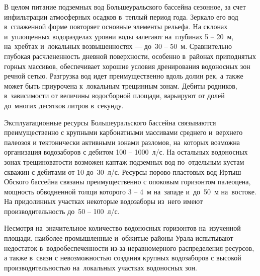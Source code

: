 В целом питание подземных вод Большеуральского бассейна сезонное, за счет инфильтрации атмосферных осадков в~теплый период года. Зеркало его вод в~сглаженной форме повторяет основные элементы рельефа. На склонах и~уплощенных водоразделах уровни воды залегают на~глубинах 5  --  20~м, на~хребтах и~локальных возвышенностях  ---  до~30  --  50~м. Сравнительно глубокая расчлененность дневной поверхности, особенно в~районах приподнятых горных массивов, обеспечивает хорошие условия дренирования водоносных зон речной сетью. Разгрузка вод идет преимущественно вдоль долин рек, а также может быть приурочена к~локальным трещинным зонам. Дебиты родников, в~зависимости от величины водосборной площади, варьируют от долей до~многих десятков литров в~секунду.

Эксплуатационные ресурсы Большеуральского бассейна связываются преимущественно с крупными карбонатными массивами среднего и~верхнего палеозоя и тектонически активными зонами разломов, на~которых возможна организация водозаборов с дебитом 100  --  1000~л/с. На остальных водоносных зонах трещиноватости возможен каптаж подземных вод по~отдельным кустам скважин с дебитами от 10 до~30~л/с. Ресурсы порово-пластовых вод Иртыш-Обского бассейна связаны преимущественно с опоковым горизонтом палеоцена, мощность обводненной толщи которого 3  --  4~м на~западе и~до~50~м на~востоке. На придолинных участках некоторые водозаборы из~него имеют производительность до~50 -- 100~л/с.

Несмотря на~значительное количество водоносных горизонтов на~изученной площади, наиболее промышленные и~обжитые районы Урала испытывают недостаток в~водообеспеченности из-за неравномерного распределения ресурсов, а также в~связи с невозможностью создания крупных водозаборов с высокой производительностью на~локальных участках водоносных зон.
